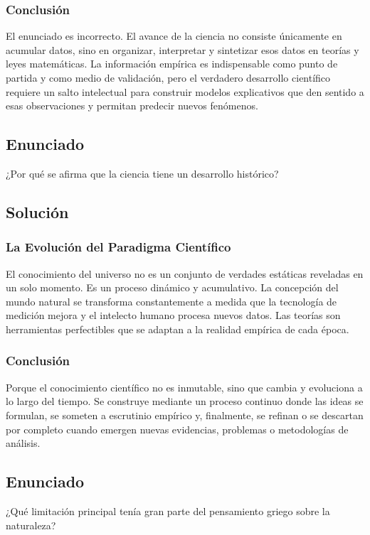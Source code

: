 \documentclass[12pt, a4paper]{article}
\begin{document}
\subsubsection*{Conclusión}
El enunciado es incorrecto. El avance de la ciencia no consiste únicamente en acumular datos, sino en organizar, interpretar y sintetizar esos datos en teorías y leyes matemáticas. La información empírica es indispensable como punto de partida y como medio de validación, pero el verdadero desarrollo científico requiere un salto intelectual para construir modelos explicativos que den sentido a esas observaciones y permitan predecir nuevos fenómenos.

\newpage

\subsection*{Enunciado}
¿Por qué se afirma que la ciencia tiene un desarrollo histórico?

\subsection*{Solución}

\subsubsection*{La Evolución del Paradigma Científico}
El conocimiento del universo no es un conjunto de verdades estáticas reveladas en un solo momento. Es un proceso dinámico y acumulativo. La concepción del mundo natural se transforma constantemente a medida que la tecnología de medición mejora y el intelecto humano procesa nuevos datos. Las teorías son herramientas perfectibles que se adaptan a la realidad empírica de cada época.

\subsubsection*{Conclusión}
Porque el conocimiento científico no es inmutable, sino que cambia y evoluciona a lo largo del tiempo. Se construye mediante un proceso continuo donde las ideas se formulan, se someten a escrutinio empírico y, finalmente, se refinan o se descartan por completo cuando emergen nuevas evidencias, problemas o metodologías de análisis.

\newpage

\subsection*{Enunciado}
¿Qué limitación principal tenía gran parte del pensamiento griego sobre la naturaleza?
\end{document}
